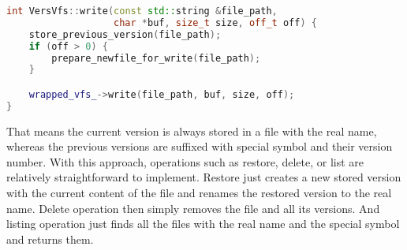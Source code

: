 \begin{lstlisting}[language=c++, caption={Write with versioning functionality}, basicstyle=\ttfamily\small]
int VersVfs::write(const std::string &file_path,
                   char *buf, size_t size, off_t off) {
    store_previous_version(file_path);
    if (off > 0) {
        prepare_newfile_for_write(file_path);
    }

    wrapped_vfs_->write(file_path, buf, size, off);
}
\end{lstlisting}

That means the current version is always stored in a file with the real name, whereas the previous versions are suffixed with special symbol and their version number.
With this approach, operations such as restore, delete, or list are relatively straightforward to implement.
Restore just creates a new stored version with the current content of the file and renames the restored version to the real name.
Delete operation then simply removes the file and all its versions.
And listing operation just finds all the files with the real name and the special symbol and returns them.